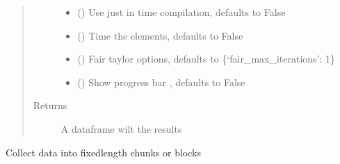 \documentclass[letterpaper,10pt,english]{sphinxmanual}
\begin{document}
\begin{fulllineitems}
\begin{fulllineitems}
\begin{quote}
\begin{description}
\begin{itemize}
\item {} 
\sphinxAtStartPar
{} (\sphinxstyleliteralemphasis{\sphinxupquote{, }}) \textendash{} Use just in time compilation, defaults to False

\item {} 
\sphinxAtStartPar
{} (\sphinxstyleliteralemphasis{\sphinxupquote{, }}) \textendash{} Time the elements, defaults to False

\item {} 
\sphinxAtStartPar
{} (\sphinxstyleliteralemphasis{\sphinxupquote{, }}) \textendash{} Fair taylor options, defaults to \{‘fair\_max\_iterations’: 1\}

\item {} 
\sphinxAtStartPar
{} (\sphinxstyleliteralemphasis{\sphinxupquote{, }}) \textendash{} Show progress bar , defaults to False

\end{itemize}

\item[{Returns}] \leavevmode
\sphinxAtStartPar
A dataframe wilt the results

\end{description}\end{quote}

\end{fulllineitems}


\begin{fulllineitems}
\label{\detokenize{index:modelclass.Solver_Mixin.grouper}}
\pysigstartsignatures
{}
\pysigstopsignatures
\sphinxAtStartPar
Collect data into fixed\sphinxhyphen{}length chunks or blocks


\end{fulllineitems}
\end{fulllineitems}
\end{document}
